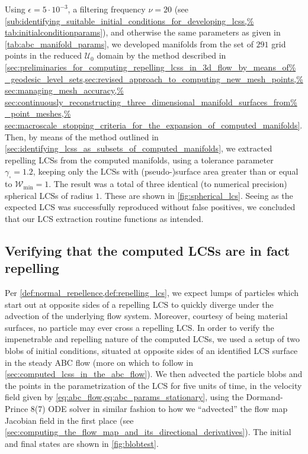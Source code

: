 

Using $\epsilon=5\cdot10^{-3}$, a filtering frequency $\nu=20$ (see
\cref{sub:identifying_suitable_initial_conditions_for_developing_lcss,%
tab:initialconditionparams}), and otherwise the same parameters as given
in \cref{tab:abc_manifold_params}, we developed manifolds from the set
of $291$ grid points in the reduced $\mathcal{U}_{0}$ domain by the method
described in
\cref{sec:preliminaries_for_computing_repelling_lcss_in_3d_flow_by_means_of%
    _geodesic_level_sets,sec:revised_approach_to_computing_new_mesh_points,%
    sec:managing_mesh_accuracy,%
    sec:continuously_reconstructing_three_dimensional_manifold_surfaces_from%
    _point_meshes,%
    sec:macroscale_stopping_criteria_for_the_expansion_of_computed_manifolds}.
Then, by means of the method outlined in
\cref{sec:identifying_lcss_as_subsets_of_computed_manifolds}, we extracted
repelling LCSs from the computed manifolds, using a tolerance parameter
$\gamma_{\square}=1.2$, keeping only the LCSs with (pseudo-)surface area
greater than or equal to $\mathcal{W}_{\min}=1$. The result was a total of
three identical (to numerical precision) spherical LCSs of radius $1$. These
are shown in \cref{fig:spherical_lcs}. Seeing as the expected LCS was
successfully reproduced without false positives, we concluded that our LCS
extraction routine functions as intended.




\subsection{Verifying that the computed LCSs are in fact repelling}
\label{sub:verifying_that_the_computed_lcss_are_in_fact_repelling}

Per \cref{def:normal_repellence,def:repelling_lcs}, we expect lumps of
particles which start out at opposite sides of a repelling LCS to quickly
diverge under the advection of the underlying flow system. Moreover, courtesy
of being material surfaces, no particle may ever cross a repelling LCS. In
order to verify the impenetrable and repelling nature of the computed LCSs, we
used a setup of two blobs of initial conditions, situated at opposite sides of
an identified LCS surface in the steady ABC flow (more on which to follow in
\cref{sec:computed_lcss_in_the_abc_flow}). We then advected the particle blobs
and the points in the parametrization of the LCS for five units of time,
in the velocity field given by \cref{eq:abc_flow,eq:abc_params_stationary},
using the Dormand-Prince 8(7) ODE solver in similar fashion to how we
``advected'' the flow map Jacobian field in the first place
(see \cref{sec:computing_the_flow_map_and_its_directional_derivatives}).
The initial and final states are shown in \cref{fig:blobtest}.

